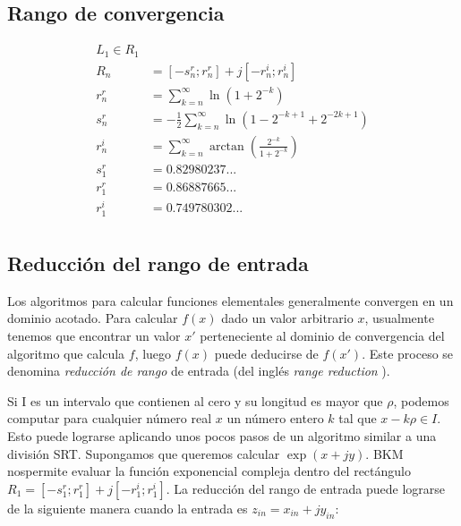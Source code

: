\documentclass[10pt,a4paper]{book}
\begin{document}
   \subsection{Rango de convergencia}

   \begin{equation} \label{eq:convergence_range_E}
      \begin{aligned}
         L_1 \in R_1                                                          \\
         R_n   &= [-s_n^r; r_n^r] + j [-r_n^i; r_n^i]                         \\
         r_n^r &= \sum_{k=n}^{\infty}  \ln(1+2^{-k})                          \\
         s_n^r &= -\frac{1}{2} \sum_{k=n}^{\infty}  \ln(1-2^{-k+1}+2^{-2k+1}) \\
         r_n^i &= \sum_{k=n}^{\infty}  \arctan(\frac{2^{-k}}{1+2^{-k}})       \\
         s_1^r &= 0.82980237...                                               \\
         r_1^r &= 0.86887665...                                               \\
         r_1^i &= 0.749780302...                                              \\
      \end{aligned}
   \end{equation}

   \subsection{Reducción del rango de entrada}


   Los algoritmos para calcular funciones elementales generalmente convergen en un dominio acotado. Para calcular $f(x)$ dado un valor arbitrario $x$, usualmente tenemos que encontrar un valor $x'$ perteneciente al dominio de convergencia del algoritmo que calcula $f$, luego $f(x)$ puede deducirse de $f(x')$. Este proceso se denomina \textit{reducción de rango} de entrada (del inglés \textit{range reduction} ).

   Si I es un intervalo que contienen al cero y su longitud es mayor que $\rho$, podemos computar para cualquier número real $x$ un número entero $k$ tal que $x-k\rho \in I$. Esto puede lograrse aplicando unos pocos pasos de un algoritmo similar a una división SRT. Supongamos que queremos calcular  $\exp(x+jy)$. BKM nospermite evaluar la función exponencial compleja dentro del rectángulo $R_1 = [-s_1^r; r_1^r] + j [-r_1^i; r_1^i]$.
   La reducción del rango de entrada puede lograrse de la siguiente manera cuando la entrada es $z_{in} = x_{in} + j y_{in}$:
\end{document}
